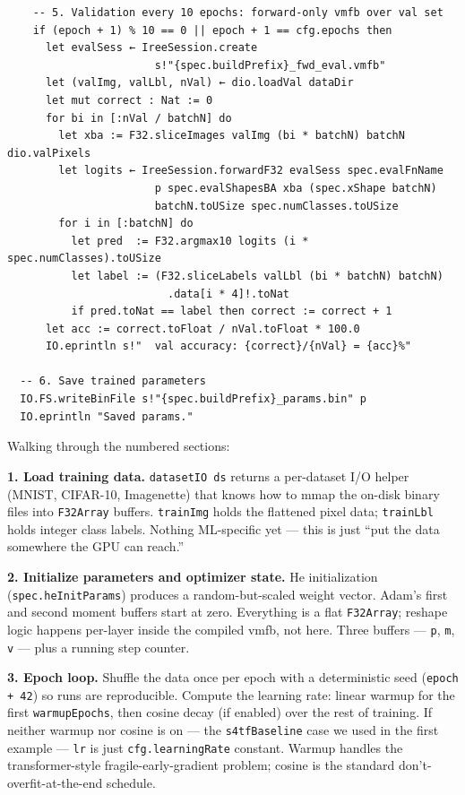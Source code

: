 \begin{verbatim}
    -- 5. Validation every 10 epochs: forward-only vmfb over val set
    if (epoch + 1) % 10 == 0 || epoch + 1 == cfg.epochs then
      let evalSess ← IreeSession.create
                       s!"{spec.buildPrefix}_fwd_eval.vmfb"
      let (valImg, valLbl, nVal) ← dio.loadVal dataDir
      let mut correct : Nat := 0
      for bi in [:nVal / batchN] do
        let xba := F32.sliceImages valImg (bi * batchN) batchN dio.valPixels
        let logits ← IreeSession.forwardF32 evalSess spec.evalFnName
                       p spec.evalShapesBA xba (spec.xShape batchN)
                       batchN.toUSize spec.numClasses.toUSize
        for i in [:batchN] do
          let pred  := F32.argmax10 logits (i * spec.numClasses).toUSize
          let label := (F32.sliceLabels valLbl (bi * batchN) batchN)
                         .data[i * 4]!.toNat
          if pred.toNat == label then correct := correct + 1
      let acc := correct.toFloat / nVal.toFloat * 100.0
      IO.eprintln s!"  val accuracy: {correct}/{nVal} = {acc}%"

  -- 6. Save trained parameters
  IO.FS.writeBinFile s!"{spec.buildPrefix}_params.bin" p
  IO.eprintln "Saved params."
\end{verbatim}

Walking through the numbered sections:

\textbf{1. Load training data.} \texttt{datasetIO ds} returns a
per-dataset I/O helper (MNIST, CIFAR-10, Imagenette) that knows how
to mmap the on-disk binary files into \texttt{F32Array} buffers.
\texttt{trainImg} holds the flattened pixel data; \texttt{trainLbl}
holds integer class labels. Nothing ML-specific yet — this is just
``put the data somewhere the GPU can reach.''

\textbf{2. Initialize parameters and optimizer state.} He
initialization (\texttt{spec.heInitParams}) produces a
random-but-scaled weight vector. Adam's first and second moment
buffers start at zero. Everything is a flat \texttt{F32Array};
reshape logic happens per-layer inside the compiled vmfb, not
here. Three buffers --- \texttt{p}, \texttt{m}, \texttt{v} --- plus
a running step counter.

\textbf{3. Epoch loop.} Shuffle the data once per epoch with a
deterministic seed (\texttt{epoch + 42}) so runs are reproducible.
Compute the learning rate: linear warmup for the first
\texttt{warmupEpochs}, then cosine decay (if enabled) over the
rest of training. If neither warmup nor cosine is on --- the
\texttt{s4tfBaseline} case we used in the first example ---
\texttt{lr} is just \texttt{cfg.learningRate} constant. Warmup
handles the transformer-style fragile-early-gradient problem;
cosine is the standard don't-overfit-at-the-end schedule.


